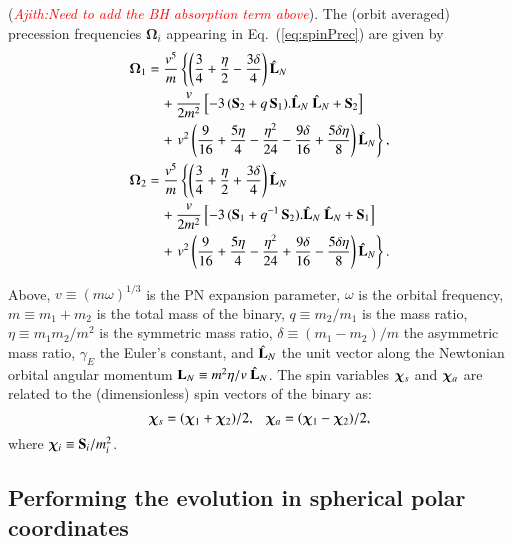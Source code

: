 \documentclass[prd,preprintnumbers,twocolumn,eqsecnum,floatfix,letter]{revtex4}
\newcommand{\ajith}[1]{\textcolor{red}{\textit{Ajith:#1}}}
\begin{document}
% 
(\ajith{Need to add the BH absorption term above}). The (orbit averaged) precession frequencies $\bm{\Omega}_i$ appearing in Eq.~(\ref{eq:spinPrec}) are given by 
\begin{align}
\label{eq:Omega}
\bm{\Omega}_1 & =  \frac{v^5}{m} \left\{\left(\frac{3}{4}+\frac{\eta}{2}-\frac{3\delta}{4}\right) \LNh \right. \nonumber \\
     & \quad +  \frac{v}{2m^2} \left[-3 \, (\bS_2 + q \, \bS_1).\LNh ~ \LNh + \bS_2 \right]  \nonumber \\
     & \quad +  \left. v^2 \left(\frac{9}{16} + \frac{5\eta}{4} - \frac{\eta^2}{24} - \frac{9\delta}{16} + \frac{5\delta \eta}{8} \right)  \LNh  \right\}, \nonumber \\
%
\bm{\Omega}_2 & =  \frac{v^5}{m} \left\{\left(\frac{3}{4}+\frac{\eta}{2}+\frac{3\delta}{4}\right) \LNh \right. \nonumber \\
     & \quad +  \frac{v}{2m^2} \left[-3 \, (\bS_1 + q^{-1} \, \bS_2).\LNh ~ \LNh + \bS_1 \right]  \nonumber \\
     & \quad +  \left. v^2 \left(\frac{9}{16} + \frac{5\eta}{4} - \frac{\eta^2}{24} + \frac{9\delta}{16} - \frac{5\delta \eta}{8} \right)  \LNh  \right\}. 
\end{align}

%
Above, $v \equiv (m \omega)^{1/3}$ is the PN expansion parameter, $\omega$ is the orbital frequency, $m \equiv m_1 + m_2$ is the total mass of the binary, $q \equiv m_2/m_1$ is the mass ratio, $\eta \equiv m_1 m_2/m^2$ is the symmetric mass ratio, $\delta \equiv (m_1-m_2)/m$ the asymmetric mass ratio, $\gamma_E$ the Euler's constant, and $\hat{\mathbf{L}}_N$ the unit vector along the Newtonian orbital angular momentum $\mathbf{L}_N \equiv m^2\eta/v ~ \hat{\mathbf{L}}_N$. The spin variables $\bm{\chi}_s$ and $\bm{\chi}_a$ are related to the (dimensionless) spin vectors of the binary as: 
%
\begin{equation}
\bm{\chi}_s = (\bm{\chi}_1 + \bm{\chi}_2)/2, ~~~ \bm{\chi}_a = (\bm{\chi}_1 - \bm{\chi}_2)/2,
\end{equation}
%
where $\bm{\chi}_i \equiv \mathbf{S}_i/m_i^2$.

\subsection{Performing the evolution in spherical polar coordinates}
\end{document}
